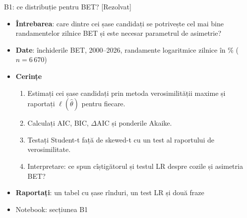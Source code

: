 \begin{frame}{B1: ce distribuție pentru BET? [Rezolvat]}
\itemsize{\footnotesize}
\begin{itemize}
\item \textbf{Întrebarea}: care dintre cei șase candidați se potrivește cel mai bine randamentelor zilnice BET și este necesar parametrul de asimetrie?
\item \textbf{Date}: închiderile BET, 2000--2026, randamente logaritmice zilnice în \% ($n = 6\,670$)
\item \textbf{Cerințe}
\begin{enumerate}
    \item Estimați cei șase candidați prin metoda verosimilității maxime și raportați $\ell(\hat\theta)$ pentru fiecare.
    \item Calculați AIC, BIC, $\Delta$AIC și ponderile Akaike.
    \item Testați Student-t față de skewed-t cu un test al raportului de verosimilitate.
    \item Interpretare: ce spun cîștigătorul și testul LR despre cozile și asimetria BET?
\end{enumerate}
\item \textbf{Raportați}: un tabel cu șase rînduri, un test LR și două fraze
\item Notebook: secțiunea B1
\end{itemize}
\end{frame}

